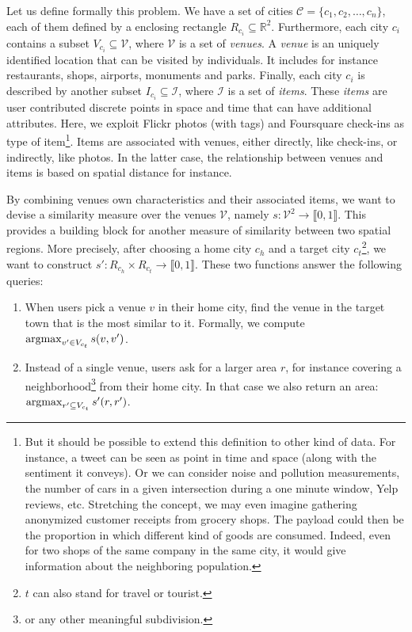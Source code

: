 Let us define formally this problem. We have a set of cities $\mathcal{C} =
\{c_1, c_2, \ldots, c_n\}$, each of them defined by a enclosing rectangle
$R_{c_i} \subseteq \mathbb{R}^2$. Furthermore, each city $c_i$ contains a
subset $V_{c_i} \subseteq \mathcal{V}$, where $\mathcal{V}$ is a set of
\emph{venues}. A \emph{venue} is an uniquely identified location that can be
visited by individuals. It includes for instance restaurants, shops, airports,
monuments and parks. Finally, each city $c_i$ is described by another subset
$I_{c_i} \subseteq \mathcal{I}$, where $\mathcal{I}$ is a set of \emph{items}.
These \emph{items} are user contributed discrete points in space and time
that can have additional attributes. Here, we exploit Flickr photos (with
tags) and Foursquare check-ins as type of item\footnote{But it should be
	possible to extend this definition to other kind of data. For
	instance, a tweet can be seen as point in time and space (along with
	the sentiment it conveys). Or we can consider noise and pollution
	measurements, the number of cars in a given intersection during a one
	minute window, Yelp reviews, etc. Stretching the concept, we may even
	imagine gathering anonymized customer receipts from grocery shops.
	The payload could then be the proportion in which different kind of
	goods are consumed. Indeed, even for two shops of the same company in
the same city, it would give information about the neighboring population.}.
Items are associated with venues, either directly, like check-ins, or
indirectly, like photos. In the latter case, the relationship between venues
and items is based on spatial distance for instance.

By combining venues own characteristics and their associated items, we want to
devise a similarity measure over the venues $\mathcal{V}$, namely $s:
\mathcal{V}^2 \rightarrow \llbracket 0, 1 \rrbracket $. This provides a
building block for another measure of similarity between two spatial regions.
More precisely, after choosing a home city $c_h$ and a target city
$c_t$\footnote{$t$ can also stand for travel or tourist.}, we want to
construct $s': R_{c_h} \times R_{c_t} \rightarrow \llbracket 0, 1 \rrbracket$.
These two functions answer the following queries:

\begin{enumerate}
\item When users pick a venue $v$ in their home city, find the venue in the
	target town that is the most similar to it. Formally, we compute
	$\operatorname*{argmax}_{v' \in V_{c_t}} s(v, v')$.\label{q:point}
\item Instead of a single venue, users ask for a larger area $r$, for instance
	covering a neighborhood\footnote{or any other meaningful subdivision.}
	from their home city. In that case we also return an area:
	$\operatorname*{argmax}_{r' \subseteq V_{c_t}} s'(r, r')$.\label{q:space}
\end{enumerate}

